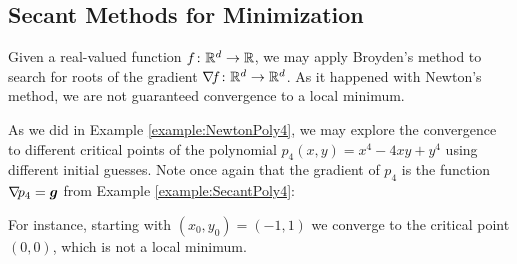 \subsection{Secant Methods for Minimization}

Given a real-valued function $f \colon \mathbb{R}^d \to \mathbb{R}$, we may apply Broyden's method to search for roots of the gradient $\mathop{\nabla\! {f}} \colon \mathbb{R}^d \to \mathbb{R}^d$.  As it happened with Newton's method, we are not guaranteed convergence to a local minimum.

\begin{example}
As we did in Example \ref{example:NewtonPoly4}, we may explore the convergence to different critical points of the polynomial $p_4(x,y) = x^4-4xy+y^4$ using different initial guesses.  Note once again that the gradient of $p_4$ is the function $\mathop{\nabla\! {p_4}} = \boldsymbol{g}$ from Example \ref{example:SecantPoly4}:

For instance, starting with $(x_0,y_0) = (-1,1)$ we converge to the critical point $(0,0)$, which is not a local minimum.
\end{example}